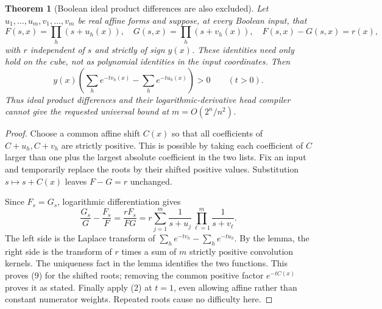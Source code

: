 \documentclass[11pt]{article}
\newtheorem{theorem}{Theorem}
\begin{document}
\begin{theorem}[Boolean ideal product differences are also excluded]
Let $u_1,\ldots,u_m,v_1,\ldots,v_m$ be real affine forms and suppose,
at every Boolean input, that
\[
 F(s,x)=\prod_h(s+u_h(x)),\quad
 G(s,x)=\prod_h(s+v_h(x)),\quad F(s,x)-G(s,x)=r(x),
\tag{8}
\]
with $r$ independent of $s$ and strictly of sign $y(x)$.
These identities need only hold on the cube, not as polynomial
identities in the input coordinates. Then
\[
 y(x)\left(\sum_h e^{-tv_h(x)}-\sum_h e^{-tu_h(x)}\right)>0
                  \qquad(t>0).
\tag{9}
\]
Thus ideal product differences and their logarithmic-derivative head
compiler cannot give the requested universal bound at
$m=O(2^n/n^2)$.
\end{theorem}
\begin{proof}
Choose a common affine shift $C(x)$ so that all coefficients of
$C+u_h,C+v_h$ are strictly positive. This is possible by taking
each coefficient of $C$ larger than one plus the largest absolute
coefficient in the two lists. Fix an input and temporarily replace
the roots by their shifted positive values. Substitution
$s\mapsto s+C(x)$ leaves $F-G=r$ unchanged.

Since $F_s=G_s$, logarithmic differentiation gives
\[
 \frac{G_s}{G}-\frac{F_s}{F}
   =\frac{r F_s}{FG}
   =r\sum_{j=1}^m\frac{1}{s+u_j}
                          \prod_{\ell=1}^m\frac{1}{s+v_\ell}.
\tag{10}
\]
The left side is the Laplace transform of
$\sum_h e^{-tv_h}-\sum_h e^{-tu_h}$. By the lemma, the
right side is the transform of $r$ times a sum of $m$ strictly
positive convolution kernels. The uniqueness fact in the lemma
identifies the two functions. This proves (9) for the shifted roots;
removing the common positive factor $e^{-tC(x)}$ proves it as stated.
Finally apply (2) at $t=1$, even allowing affine rather than
constant numerator weights. Repeated roots cause no difficulty here.
\end{proof}
\end{document}
